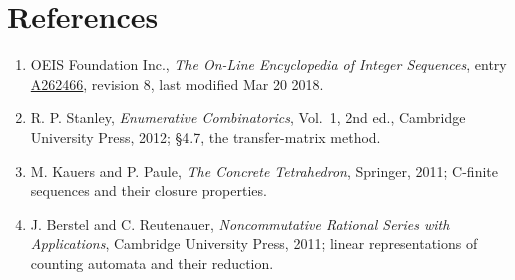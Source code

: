 \documentclass[11pt]{article}
\theoremstyle{definition}
\begin{document}
\section{References}

\begin{enumerate}

\item OEIS Foundation Inc., \emph{The On-Line Encyclopedia of Integer Sequences}, entry \href{https://oeis.org/A262466}{A262466}, revision 8, last modified Mar 20 2018.

\item R. P. Stanley, \emph{Enumerative Combinatorics}, Vol.~1, 2nd ed., Cambridge University Press, 2012; \S4.7, the transfer-matrix method.

\item M. Kauers and P. Paule, \emph{The Concrete Tetrahedron}, Springer, 2011; C-finite sequences and their closure properties.

\item J. Berstel and C. Reutenauer, \emph{Noncommutative Rational Series with Applications}, Cambridge University Press, 2011; linear representations of counting automata and their reduction.

\end{enumerate}
\end{document}
